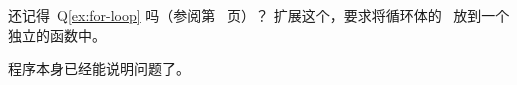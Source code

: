\begin{Exercise}[title={For-loop II},difficulty=0]
\label{ex:for-loop II}
\Question 还记得~Q\ref{ex:for-loop} 吗（参阅第~\pageref{ex;for-loop} 页）？
扩展这个，要求将循环体的~ 放到一个独立的函数中。
\end{Exercise}

\begin{Answer}
\begin{minipage}{\textwidth}

\end{minipage}
程序本身已经能说明问题了。
\end{Answer}

